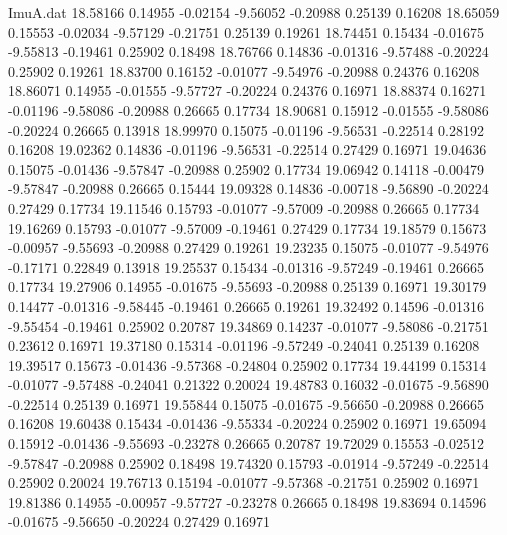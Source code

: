 \begin{filecontents}{ImuA.dat}
  18.58166    0.14955   -0.02154   -9.56052   -0.20988    0.25139    0.16208
  18.65059    0.15553   -0.02034   -9.57129   -0.21751    0.25139    0.19261
  18.74451    0.15434   -0.01675   -9.55813   -0.19461    0.25902    0.18498
  18.76766    0.14836   -0.01316   -9.57488   -0.20224    0.25902    0.19261
  18.83700    0.16152   -0.01077   -9.54976   -0.20988    0.24376    0.16208
  18.86071    0.14955   -0.01555   -9.57727   -0.20224    0.24376    0.16971
  18.88374    0.16271   -0.01196   -9.58086   -0.20988    0.26665    0.17734
  18.90681    0.15912   -0.01555   -9.58086   -0.20224    0.26665    0.13918
  18.99970    0.15075   -0.01196   -9.56531   -0.22514    0.28192    0.16208
  19.02362    0.14836   -0.01196   -9.56531   -0.22514    0.27429    0.16971
  19.04636    0.15075   -0.01436   -9.57847   -0.20988    0.25902    0.17734
  19.06942    0.14118   -0.00479   -9.57847   -0.20988    0.26665    0.15444
  19.09328    0.14836   -0.00718   -9.56890   -0.20224    0.27429    0.17734
  19.11546    0.15793   -0.01077   -9.57009   -0.20988    0.26665    0.17734
  19.16269    0.15793   -0.01077   -9.57009   -0.19461    0.27429    0.17734
  19.18579    0.15673   -0.00957   -9.55693   -0.20988    0.27429    0.19261
  19.23235    0.15075   -0.01077   -9.54976   -0.17171    0.22849    0.13918
  19.25537    0.15434   -0.01316   -9.57249   -0.19461    0.26665    0.17734
  19.27906    0.14955   -0.01675   -9.55693   -0.20988    0.25139    0.16971
  19.30179    0.14477   -0.01316   -9.58445   -0.19461    0.26665    0.19261
  19.32492    0.14596   -0.01316   -9.55454   -0.19461    0.25902    0.20787
  19.34869    0.14237   -0.01077   -9.58086   -0.21751    0.23612    0.16971
  19.37180    0.15314   -0.01196   -9.57249   -0.24041    0.25139    0.16208
  19.39517    0.15673   -0.01436   -9.57368   -0.24804    0.25902    0.17734
  19.44199    0.15314   -0.01077   -9.57488   -0.24041    0.21322    0.20024
  19.48783    0.16032   -0.01675   -9.56890   -0.22514    0.25139    0.16971
  19.55844    0.15075   -0.01675   -9.56650   -0.20988    0.26665    0.16208
  19.60438    0.15434   -0.01436   -9.55334   -0.20224    0.25902    0.16971
  19.65094    0.15912   -0.01436   -9.55693   -0.23278    0.26665    0.20787
  19.72029    0.15553   -0.02512   -9.57847   -0.20988    0.25902    0.18498
  19.74320    0.15793   -0.01914   -9.57249   -0.22514    0.25902    0.20024
  19.76713    0.15194   -0.01077   -9.57368   -0.21751    0.25902    0.16971
  19.81386    0.14955   -0.00957   -9.57727   -0.23278    0.26665    0.18498
  19.83694    0.14596   -0.01675   -9.56650   -0.20224    0.27429    0.16971

\end{filecontents}
